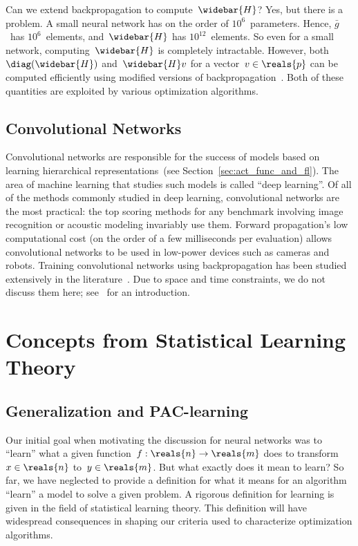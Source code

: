 \documentclass[11pt,a4paper]{article}
\numberwithin{equation}{section}
\begin{document}
Can we extend backpropagation to compute~$\widebar{H}$? Yes, but there is a problem.
A small neural network has on the order of $10^6$~parameters. Hence,
$\bar{g}$~has $10^6$~elements, and~$\widebar{H}$ has $10^{12}$~elements. So even for
a small network, computing~$\widebar{H}$ is completely intractable. However,
both~$\diag(\widebar{H})$ and~$\widebar{H}v$ for a vector~$v \in \reals{p}$ can be
computed efficiently using modified versions of
backpropagation~\citep{ml_bishop}. Both of these quantities are exploited by
various optimization algorithms.

\subsection{Convolutional Networks}

Convolutional networks are responsible for the success of models based on
learning hierarchical representations~(see Section~\ref{sec:act_func_and_fl}).
The area of machine learning that studies such models is called ``deep
learning''. Of all of the methods commonly studied in deep learning,
convolutional networks are the most practical: the top scoring methods for any
benchmark involving image recognition or acoustic modeling invariably use them.
Forward propagation's low computational cost (on the order of a few milliseconds
per evaluation) allows convolutional networks to be used in low-power devices
such as cameras and robots. Training convolutional networks using
backpropagation has been studied extensively in the
literature~\citep{lecun-98b}. Due to space and time constraints, we do not
discuss them here; see~\citet{ufldl-website} for an introduction.

\section{Concepts from Statistical Learning Theory}
\label{src:concepts_from_slt}

\subsection{Generalization and PAC-learning}

Our initial goal when motivating the discussion for neural networks was to
``learn'' what a given function~$f: \reals{n} \to \reals{m}$ does to
transform~$x \in \reals{n}$ to~$y \in \reals{m}$. But what exactly does it mean
to learn? So far, we have neglected to provide a definition for what it means
for an algorithm ``learn'' a model to solve a given problem. A rigorous
definition for learning is given in the field of statistical learning theory.
This definition will have widespread consequences in shaping our criteria used
to characterize optimization algorithms.
\end{document}
